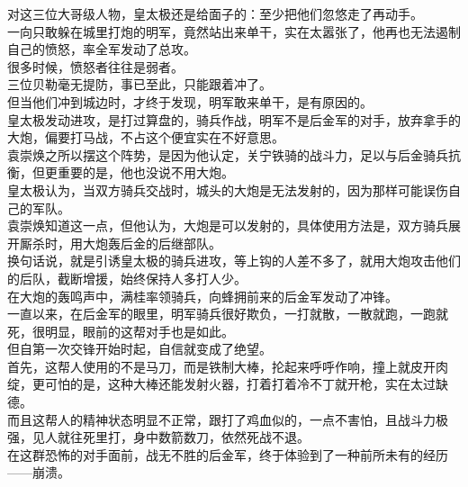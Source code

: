 \begin{multicols}{\theparacolNo}
对这三位大哥级人物，皇太极还是给面子的：至少把他们忽悠走了再动手。\\

一向只敢躲在城里打炮的明军，竟然站出来单干，实在太嚣张了，他再也无法遏制自己的愤怒，率全军发动了总攻。\\

很多时候，愤怒者往往是弱者。\\

三位贝勒毫无提防，事已至此，只能跟着冲了。\\

但当他们冲到城边时，才终于发现，明军敢来单干，是有原因的。\\

皇太极发动进攻，是打过算盘的，骑兵作战，明军不是后金军的对手，放弃拿手的大炮，偏要打马战，不占这个便宜实在不好意思。\\

袁崇焕之所以摆这个阵势，是因为他认定，关宁铁骑的战斗力，足以与后金骑兵抗衡，但更重要的是，他也没说不用大炮。\\

皇太极认为，当双方骑兵交战时，城头的大炮是无法发射的，因为那样可能误伤自己的军队。\\

袁崇焕知道这一点，但他认为，大炮是可以发射的，具体使用方法是，双方骑兵展开厮杀时，用大炮轰后金的后继部队。\\

换句话说，就是引诱皇太极的骑兵进攻，等上钩的人差不多了，就用大炮攻击他们的后队，截断增援，始终保持人多打人少。\\

在大炮的轰鸣声中，满桂率领骑兵，向蜂拥前来的后金军发动了冲锋。\\

一直以来，在后金军的眼里，明军骑兵很好欺负，一打就散，一散就跑，一跑就死，很明显，眼前的这帮对手也是如此。\\

但自第一次交锋开始时起，自信就变成了绝望。\\

首先，这帮人使用的不是马刀，而是铁制大棒，抡起来呼呼作响，撞上就皮开肉绽，更可怕的是，这种大棒还能发射火器，打着打着冷不丁就开枪，实在太过缺德。\\

而且这帮人的精神状态明显不正常，跟打了鸡血似的，一点不害怕，且战斗力极强，见人就往死里打，身中数箭数刀，依然死战不退。\\

在这群恐怖的对手面前，战无不胜的后金军，终于体验到了一种前所未有的经历——崩溃。\\


\end{multicols}
